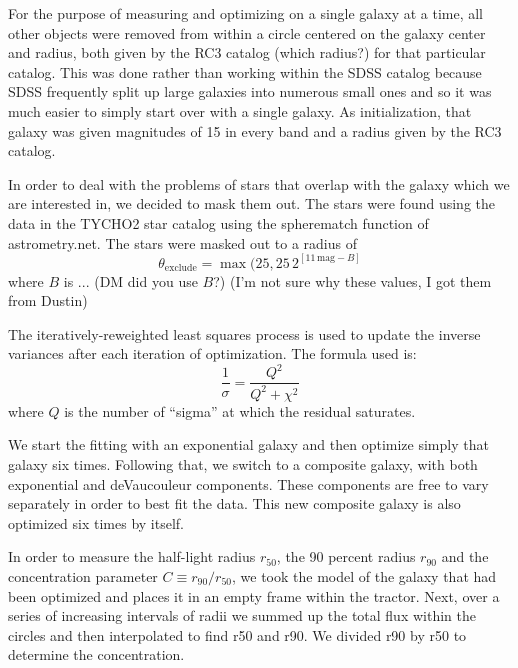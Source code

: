 \documentclass{article}
\newcommand{\units}[1]{\mathrm{#1}}
\renewcommand{\mag}{\units{mag}}
\newcommand{\rfifty}{r_{50}}
\newcommand{\rninety}{r_{90}}
\newcommand{\conc}{C}
\begin{document}
For the purpose of measuring and optimizing on a single galaxy at a
time, all other objects were removed from within a circle centered on
the galaxy center and radius, both given by the RC3 catalog (which
radius?) for that particular catalog. This was done rather than
working within the SDSS catalog because SDSS frequently split up large
galaxies into numerous small ones and so it was much easier to simply
start over with a single galaxy. As initialization, that galaxy was
given magnitudes of 15 in every band and a radius given by the RC3
catalog.

In order to deal with the problems of stars that overlap with the
galaxy which we are interested in, we decided to mask them out. The
stars were found using the data in the TYCHO2 star catalog using the
spherematch function of astrometry.net. The stars were masked out to a
radius of
\begin{equation}
\theta_{\mathrm{exclude}} = \max(25, 25\,2^{[11\,\mag-B]}
\end{equation}
where $B$ is ...
(DM did you use $B$?)
(I'm not sure why these values, I got them from Dustin)

The iteratively-reweighted least squares process is used to update the
inverse variances after each iteration of optimization. The formula
used is: \begin{equation} \frac{1}{\sigma}=\frac{Q^2}{Q^2+\chi^2}
\end{equation}
where $Q$ is the number of ``sigma'' at which the residual saturates.

We start the fitting with an exponential galaxy and then optimize
simply that galaxy six times. Following that, we switch to a composite
galaxy, with both exponential and deVaucouleur components. These
components are free to vary separately in order to best fit the
data. This new composite galaxy is also optimized six times by itself.

In order to measure the half-light radius $\rfifty$, the 90 percent
radius $\rninety$ and the concentration parameter $\conc\equiv
\rninety/\rfifty$, we took the model of the galaxy that had been
optimized and places it in an empty frame within the tractor. Next,
over a series of increasing intervals of radii we summed up the total
flux within the circles and then interpolated to find r50 and r90. We
divided r90 by r50 to determine the concentration.
\end{document}
